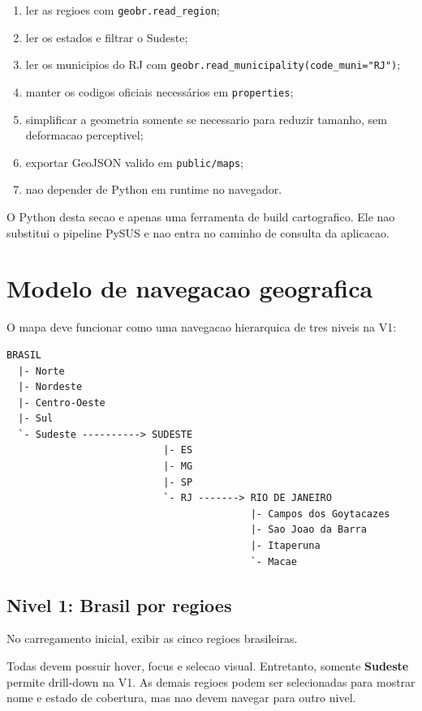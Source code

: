 \documentclass[12pt,a4paper]{article}
\begin{document}
\begin{enumerate}[leftmargin=*]
    \item ler as regioes com \texttt{geobr.read\_region};
    \item ler os estados e filtrar o Sudeste;
    \item ler os municipios do RJ com \texttt{geobr.read\_municipality(code\_muni="RJ")};
    \item manter os codigos oficiais necessários em \texttt{properties};
    \item simplificar a geometria somente se necessario para reduzir tamanho, sem deformacao perceptivel;
    \item exportar GeoJSON valido em \texttt{public/maps};
    \item nao depender de Python em runtime no navegador.
\end{enumerate}

\begin{decision}
O Python desta secao e apenas uma ferramenta de build cartografico. Ele nao substitui o pipeline PySUS e nao entra no caminho de consulta da aplicacao.
\end{decision}

\section{Modelo de navegacao geografica}

O mapa deve funcionar como uma navegacao hierarquica de tres niveis na V1:

\begin{lstlisting}
BRASIL
  |- Norte
  |- Nordeste
  |- Centro-Oeste
  |- Sul
  `- Sudeste ----------> SUDESTE
                           |- ES
                           |- MG
                           |- SP
                           `- RJ -------> RIO DE JANEIRO
                                          |- Campos dos Goytacazes
                                          |- Sao Joao da Barra
                                          |- Itaperuna
                                          `- Macae
\end{lstlisting}

\subsection{Nivel 1: Brasil por regioes}

No carregamento inicial, exibir as cinco regioes brasileiras.

Todas devem possuir hover, focus e selecao visual. Entretanto, somente \textbf{Sudeste} permite drill-down na V1. As demais regioes podem ser selecionadas para mostrar nome e estado de cobertura, mas nao devem navegar para outro nivel.
\end{document}
